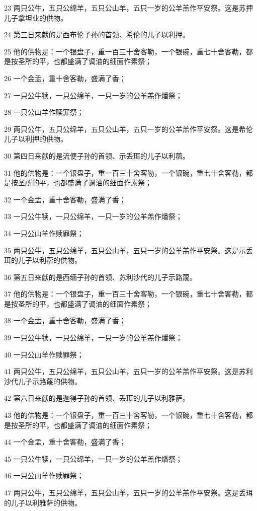 \par 23 两只公牛，五只公绵羊，五只公山羊，五只一岁的公羊羔作平安祭。这是苏押儿子拿坦业的供物。
\par 24 第三日来献的是西布伦子孙的首领、希伦的儿子以利押。
\par 25 他的供物是：一个银盘子，重一百三十舍客勒，一个银碗，重七十舍客勒，都是按圣所的平，也都盛满了调油的细面作素祭；
\par 26 一个金盂，重十舍客勒，盛满了香；
\par 27 一只公牛犊，一只公绵羊，一只一岁的公羊羔作燔祭；
\par 28 一只公山羊作赎罪祭；
\par 29 两只公牛，五只公绵羊，五只公山羊，五只一岁的公羊羔作平安祭。这是希伦儿子以利押的供物。
\par 30 第四日来献的是流便子孙的首领、示丢珥的儿子以利蓿。
\par 31 他的供物是：一个银盘子，重一百三十舍客勒，一个银碗，重七十舍客勒，都是按圣所的平，也都盛满了调油的细面作素祭；
\par 32 一个金盂，重十舍客勒，盛满了香；
\par 33 一只公牛犊，一只公绵羊，一只一岁的公羊羔作燔祭；
\par 34 一只公山羊作赎罪祭；
\par 35 两只公牛，五只公绵羊，五只公山羊，五只一岁的公羊羔作平安祭。这是示丢珥的儿子以利蓿的供物。
\par 36 第五日来献的是西缅子孙的首领、苏利沙代的儿子示路蔑。
\par 37 他的供物是：一个银盘子，重一百三十舍客勒，一个银碗，重七十舍客勒，都是按圣所的平，也都盛满了调油的细面作素祭；
\par 38 一个金盂，重十舍客勒，盛满了香；
\par 39 一只公牛犊，一只公绵羊，一只一岁的公羊羔作燔祭；
\par 40 一只公山羊作赎罪祭；
\par 41 两只公牛，五只公绵羊，五只公山羊，五只一岁的公羊羔作平安祭。这是苏利沙代儿子示路蔑的供物。
\par 42 第六日来献的是迦得子孙的首领、丢珥的儿子以利雅萨。
\par 43 他的供物是：一个银盘子，重一百三十舍客勒，一个银碗，重七十舍客勒，都是按圣所的平，也都盛满了调油的细面作素祭；
\par 44 一个金盂，重十舍客勒，盛满了香；
\par 45 一只公牛犊，一只公绵羊，一只一岁的公羊羔作燔祭；
\par 46 一只公山羊作赎罪祭；
\par 47 两只公牛，五只公绵羊，五只公山羊，五只一岁的公羊羔作平安祭。这是丢珥的儿子以利雅萨的供物。
